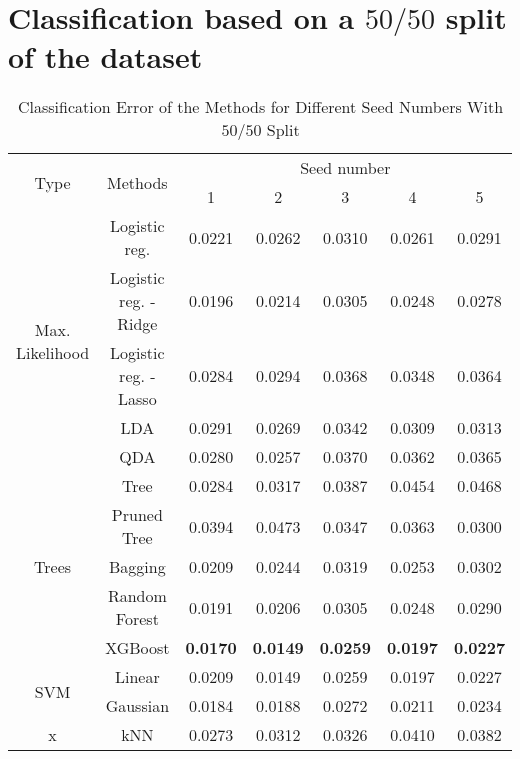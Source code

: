 \section{Classification based on a $50/50$ split of the dataset}
\begin{table}[htb]
	\caption{Classification Error of the Methods for Different Seed Numbers With $50/50$ Split}
	\begin{center}
		\begin{tabular}{@{} c c c  c c c c @{}}\toprule
			\multirow{2}{*}{Type} & \multirow{2}{*}{Methods} &  \multicolumn{5}{c}{Seed number}\\
			& & 1 & 2 & 3 & 4 & 5 \\
			\midrule
			\multirow{5}{*}{Max. Likelihood} & Logistic reg. & \num{0.0221} & \num{0.0262} & \num{0.0310} & \num{0.0261} & \num{0.0291} \\
			& Logistic reg. - Ridge & \num{0.0196} & \num{0.0214} & \num{0.0305} & \num{0.0248} & \num{0.0278} \\
			& Logistic reg. - Lasso & \num{0.0284} & \num{0.0294} & \num{0.0368} & \num{0.0348} & \num{0.0364} \\
			& LDA & \num{0.0291} & \num{0.0269} & \num{0.0342} & \num{0.0309} & \num{0.0313} \\
			& QDA & \num{0.0280} & \num{0.0257} & \num{0.0370} & \num{0.0362} & \num{0.0365} \\
			\cmidrule{1-7}
			\multirow{5}{*}{Trees} & Tree & \num{0.0284} & \num{0.0317} & \num{0.0387} & \num{0.0454} & \num{0.0468}\\
			& Pruned Tree & \num{0.0394} & \num{0.0473} & \num{0.0347} & \num{0.0363} & \num{0.0300}\\  
			& Bagging & \num{0.0209} & \num{0.0244} & \num{0.0319} & \num{0.0253} & \num{0.0302}\\
			& Random Forest & \num{0.0191} & \num{0.0206} & \num{0.0305} & \num{0.0248} & \num{0.0290}\\
			& XGBoost & \textbf{\num{0.0170}} & \textbf{\num{0.0149}} & \textbf{\num{0.0259}} & \textbf{\num{0.0197}} & \textbf{\num{0.0227}}\\
			\cmidrule{1-7}
			\multirow{2}{*}{SVM} & Linear & \num{0.0209} & \num{0.0149} & \num{0.0259} & \num{0.0197} & \num{0.0227}\\
			& Gaussian & \num{0.0184} & \num{0.0188} & \num{0.0272} & \num{0.0211} & \num{0.0234}\\
			\cmidrule{1-7}
			x & kNN & \num{0.0273} & \num{0.0312} & \num{0.0326} & \num{0.0410} & \num{0.0382}\\
			\bottomrule
		\end{tabular}
	\end{center}
	\label{tab_res_our_strategy}
\end{table}